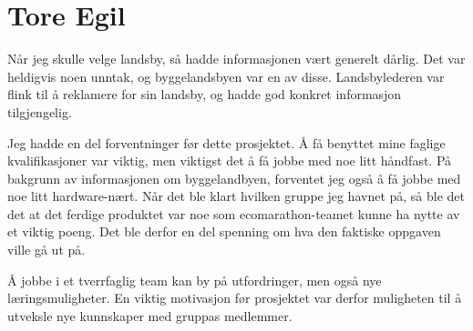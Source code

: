 \section{Tore Egil}
Når jeg skulle velge landsby, så hadde informasjonen vært generelt dårlig.
Det var heldigvis noen unntak, og byggelandsbyen var en av disse.
Landsbylederen var flink til å reklamere for sin landsby, og hadde god konkret informasjon tilgjengelig. 

Jeg hadde en del forventninger før dette prosjektet. 
Å få benyttet mine faglige kvalifikasjoner var viktig, men viktigst det å få jobbe med noe litt håndfast.
På bakgrunn av informasjonen om byggelandbyen, forventet jeg også å få jobbe med noe litt hardware-nært.
Når det ble klart hvilken gruppe jeg havnet på, så ble det det at det ferdige produktet var noe som ecomarathon-teamet kunne ha nytte av et viktig poeng.
Det ble derfor en del spenning om hva den faktiske oppgaven ville gå ut på.

Å jobbe i et tverrfaglig team kan by på utfordringer, men også nye læringsmuligheter. 
En viktig motivasjon før prosjektet var derfor muligheten til å utveksle nye kunnskaper med gruppas medlemmer.



